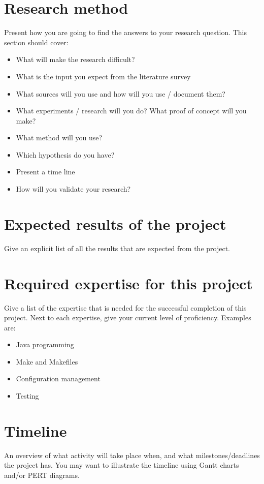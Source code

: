 \documentclass{article}
\begin{document}
\section{Research method} 
Present how you are going to find the answers to your research question. This section should cover:
\begin{itemize}
    \item What will make the research difficult?
    \item What is the input you expect from the literature survey
    \item What sources will you use and how will you use / document them?
    \item What experiments / research will you do? What proof of concept will you make?
	\item What method will you use?
	\item Which hypothesis do you have?
    \item Present a time line
	\item How will you validate your research?
\end{itemize}
	
\section{Expected results of the project} 
Give an explicit list of all the results that are expected from the project. 

\section{Required expertise for this project}
Give a list of the expertise that is needed for the successful completion of this project. Next to each expertise, give your current level of proficiency. Examples are:
\begin{itemize}
    \item Java programming
	\item	  Make and Makefiles
	\item	  Configuration management
	\item	  Testing
\end{itemize}


\section{Timeline}
An overview of what activity will take place when, and what milestones/deadlines the project has.
You may want to illustrate the timeline using Gantt charts and/or PERT diagrams.
\end{document}
